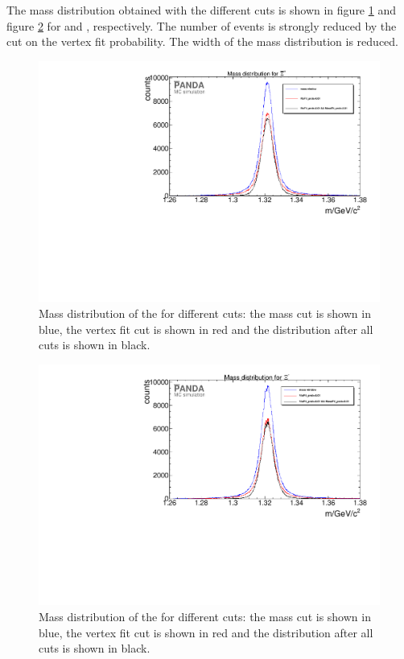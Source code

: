		The mass distribution obtained with the different cuts is shown in figure \ref{fig:XiPlus_massdiffcuts} and figure \ref{fig:XiMinus_massdiffcuts} 
		for \anticascade and \cascade, respectively.
		The number of events is strongly reduced by the cut on the vertex fit probability. 
		The width of the mass distribution is reduced. 
		
		\begin{figure}
			\centering
				\includegraphics[width=1.1\textwidth]{./plots/Xi/XiPlus_m_diffcuts.pdf}
			\caption{\propose Mass distribution of the \anticascade for different cuts: the mass cut is shown in blue, the vertex fit cut is shown in red 
					and the distribution after all cuts is shown in black.}
			\label{fig:XiPlus_massdiffcuts}
		\end{figure}
		
		\begin{figure}
			\centering		
				\includegraphics[width=1.1\textwidth]{./plots/Xi/XiMinus_m_diffcuts.pdf}
			\caption{\propose Mass distribution of the \cascade for different cuts: the mass cut is shown in blue, the vertex fit cut is shown in red 
					and the distribution after all cuts is shown in black.}
			\label{fig:XiMinus_massdiffcuts}
		\end{figure}
		
